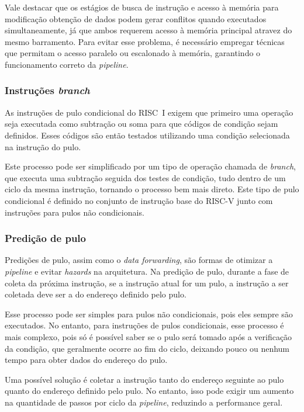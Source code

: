 \documentclass[
	12pt,				%
	openright,			%
	oneside,			%
	a4paper,			%
	english,			%
	french,				%
	spanish,			%
	brazil,				%
	]{abntex2}
\begin{document}
Vale destacar que os estágios de busca de instrução e acesso à memória para modificação obtenção de dados podem gerar conflitos quando executados simultaneamente, já que ambos requerem acesso à memória principal atravez do mesmo barramento. Para evitar esse problema, é necessário empregar técnicas que permitam o acesso paralelo ou escalonado à memória, garantindo o funcionamento correto da \textit{pipeline}.

\subsubsection{Instruções \textit{branch}}\label{recursos_branch}%

As instruções de pulo condicional do RISC~I exigem que primeiro uma operação seja executada como subtração ou soma para que códigos de condição sejam definidos. Esses códigos são então testados utilizando uma condição selecionada na instrução do pulo.

Este processo pode ser simplificado por um tipo de operação chamada de \textit{branch}, que executa uma subtração seguida dos testes de condição, tudo dentro de um ciclo da mesma instrução, tornando o processo bem mais direto. Este tipo de pulo condicional é definido no conjunto de instrução base do RISC-V junto com instruções para pulos não condicionais.

\subsubsection{Predição de pulo}\label{recursos_pred_pulo}%

Predições de pulo, assim como o \textit{data forwarding}, são formas de otimizar a \textit{pipeline} e evitar \textit{hazards} na arquitetura. Na predição de pulo, durante a fase de coleta da próxima instrução, se a instrução atual for um pulo, a instrução a ser coletada deve ser a do endereço definido pelo pulo.

Esse processo pode ser simples para pulos não condicionais, pois eles sempre são executados. No entanto, para instruções de pulos condicionais, esse processo é mais complexo, pois só é possível saber se o pulo será tomado após a verificação da condição, que geralmente ocorre ao fim do ciclo, deixando pouco ou nenhum tempo para obter dados do endereço do pulo.

Uma possível solução é coletar a instrução tanto do endereço seguinte ao pulo quanto do endereço definido pelo pulo. No entanto, isso pode exigir um aumento na quantidade de passos por ciclo da \textit{pipeline}, reduzindo a performance geral.
\end{document}
